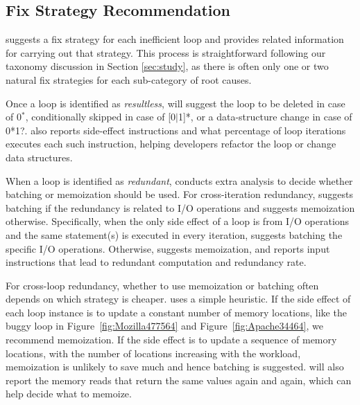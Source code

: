 \subsection{Fix Strategy Recommendation}
\label{sec:redundant_fix}

\Tool suggests a fix strategy for each inefficient loop 
and provides related information for carrying out that strategy.
This process is straightforward following our taxonomy discussion in 
Section \ref{sec:study}, as there is often only one or two natural fix 
strategies for each sub-category of root causes.

Once a loop is identified as \emph{resultless}, \Tool will suggest
the loop to be deleted in case of 0$^*$,
conditionally skipped in case of [0$|$1]*, or a
data-structure change in case of 0*1?.
\Tool also reports side-effect instructions 
and what percentage of loop iterations executes each such instruction,
helping developers refactor the loop or change data structures. 

When a loop is identified as \emph{redundant}, \Tool conducts
extra analysis to
decide whether batching or memoization should be used. 
For cross-iteration redundancy, \Tool suggests batching if the
redundancy is related to I/O operations and suggests memoization otherwise.
Specifically, when the only side effect of a loop is from I/O operations
and the same statement(s) is executed in every iteration, \Tool suggests
batching the specific I/O operations.
Otherwise, \Tool suggests memoization, and reports
input instructions that lead to redundant computation and redundancy rate.

For cross-loop redundancy, whether to use memoization or batching often
depends on which strategy is cheaper.
\Tool uses a simple
heuristic. If 
the side effect of each loop instance is to update 
a constant number of memory locations, like the 
buggy loop in Figure~\ref{fig:Mozilla477564} and Figure~\ref{fig:Apache34464}, 
we recommend memoization. If the side effect is to update
a sequence of memory locations, with the number of locations increasing
with the workload, memoization is unlikely to save much and
hence batching is suggested.
\Tool will also report
the memory reads that return the same values
again and again, which can help decide what to memoize.

